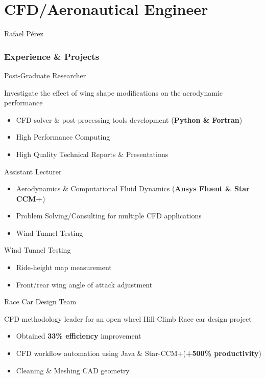 \documentclass[fontsize=10pt]{tccv}
\begin{document}
\part{CFD/Aeronautical Engineer}{Rafael P\'erez}

\section{Experience \& Projects}
\begin{eventlist}
     {Post-Graduate Researcher}

Investigate the effect of wing shape modifications on
the aerodynamic performance
\begin{itemize}
	\itemsep -2pt
	\item CFD solver \& post-processing tools development (\textbf{Python \& Fortran}) 
	\item High Performance Computing
	\item High Quality Technical Reports \& Presentations
\end{itemize}

	{Assistant Lecturer}
\begin{itemize}
	\itemsep -2pt
	\item Aerodynamics \& Computational Fluid Dynamics (\textbf{Ansys Fluent \& Star
	CCM+})
	\item Problem Solving/Consulting for multiple CFD applications
	\item Wind Tunnel Testing
\end{itemize}

     {Wind Tunnel Testing}
     \begin{itemize}
	\itemsep -2pt
     	\item Ride-height map measurement
     	\item Front/rear wing angle of attack adjustment
     \end{itemize}

     {Race Car Design Team}

CFD methodology leader for an open wheel Hill Climb Race car design project
     \begin{itemize}
	\itemsep -2pt
     	\item Obtained \textbf{33\% efficiency} improvement
     	\item CFD workflow automation using Java \& Star-CCM+(\textbf{+500\% productivity})
	\item Cleaning \& Meshing CAD geometry
     \end{itemize}


\end{eventlist}
\end{document}
